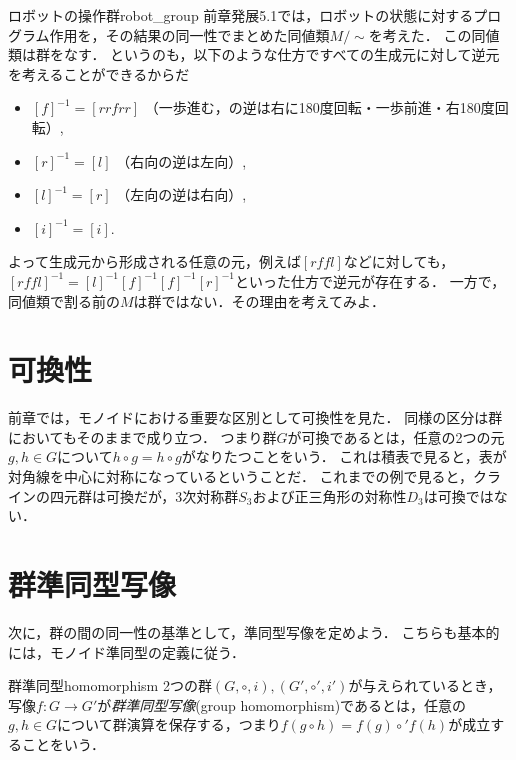 \documentclass[11pt,a4paper, dvipdfmx]{jsarticle}
\begin{document}
\begin{rei}{ロボットの操作群}{robot_group}
    前章発展5.1では，ロボットの状態に対するプログラム作用を，その結果の同一性でまとめた同値類$M/\sim$を考えた．
    この同値類は群をなす．
    というのも，以下のような仕方ですべての生成元に対して逆元を考えることができるからだ
    \begin{itemize}
        \item $[f]^{-1} = [rrfrr]$ （一歩進む，の逆は右に180度回転・一歩前進・右180度回転）,
        \item $[r]^{-1} = [l]$ （右向の逆は左向）,
        \item $[l]^{-1} = [r]$ （左向の逆は右向）,
        \item $[i]^{-1} = [i]$.
    \end{itemize}
    よって生成元から形成される任意の元，例えば$[rffl]$などに対しても，$[rffl]^{-1} = [l]^{-1} [f]^{-1} [f]^{-1} [r]^{-1}$といった仕方で逆元が存在する．
    一方で，同値類で割る前の$M$は群ではない．その理由を考えてみよ．
\end{rei}


\section{可換性}
前章では，モノイドにおける重要な区別として可換性を見た．
同様の区分は群においてもそのままで成り立つ．
つまり群$G$が可換であるとは，任意の2つの元$g,h \in G$について$h \circ g = h \circ g$がなりたつことをいう．
これは積表で見ると，表が対角線を中心に対称になっているということだ．
これまでの例で見ると，クラインの四元群は可換だが，3次対称群$S_3$および正三角形の対称性$D_3$は可換ではない．


\section{群準同型写像}
次に，群の間の同一性の基準として，準同型写像を定めよう．
こちらも基本的には，モノイド準同型の定義に従う．

\begin{dfn}{群準同型}{homomorphism}
    2つの群$(G, \circ, i), (G', \circ', i')$が与えられているとき，写像$f:G \to G'$が\emph{群準同型写像}(group homomorphism)であるとは，任意の$g,h \in G$について群演算を保存する，つまり$f(g\circ h) = f(g) \circ' f(h)$が成立することをいう．
\end{dfn}    
\end{document}
